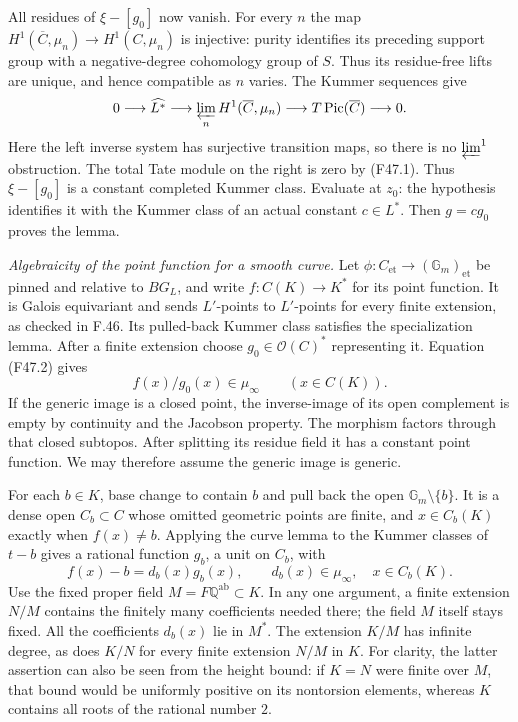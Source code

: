 All residues of $\xi-[g_0]$ now vanish. For every $n$ the map
$H^1(\overline C,\mu_n)\to H^1(C,\mu_n)$ is injective: purity
identifies its preceding support group with a negative-degree
cohomology group of $S$. Thus its residue-free lifts are unique,
and hence compatible as $n$ varies. The Kummer sequences give
\[
 0\longrightarrow\widehat{L^*}\longrightarrow
  \varprojlim_n H^1(\overline C,\mu_n)
  \longrightarrow T\operatorname{Pic}(\overline C)
  \longrightarrow0.
\]
Here the left inverse system has surjective transition maps, so
there is no $\varprojlim^1$ obstruction. The total Tate module on
the right is zero by (F47.1). Thus $\xi-[g_0]$ is a constant
completed Kummer class. Evaluate at $z_0$: the hypothesis identifies
it with the Kummer class of an actual constant $c\in L^*$.
Then $g=cg_0$ proves the lemma.

\emph{Algebraicity of the point function for a smooth curve.}
Let
$\phi:C_{\mathrm{et}}\to(\mathbb G_m)_{\mathrm{et}}$
be pinned and relative to $B G_L$, and write
$f:C(K)\to K^*$ for its point function. It is Galois equivariant
and sends $L'$-points to $L'$-points for every finite extension,
as checked in F.46. Its pulled-back Kummer class satisfies the
specialization lemma. After a finite extension choose
$g_0\in\mathcal O(C)^*$ representing it. Equation (F47.2) gives
\[
 f(x)/g_0(x)\in\mu_\infty\qquad(x\in C(K)).                 \tag{F47.4}
\]
If the generic image is a closed point, the inverse-image of its
open complement is empty by continuity and the Jacobson property.
The morphism factors through that closed subtopos. After splitting
its residue field it has a constant point function. We may therefore
assume the generic image is generic.

For each $b\in K$, base change to contain $b$ and pull back the
open $\mathbb G_m\setminus\{b\}$. It is a dense open
$C_b\subset C$ whose omitted geometric points are finite, and
$x\in C_b(K)$ exactly when $f(x)\ne b$. Applying the curve lemma
to the Kummer classes of $t-b$ gives a rational function $g_b$, a
unit on $C_b$, with
\[
 f(x)-b=d_b(x)g_b(x),\qquad d_b(x)\in\mu_\infty,
       \quad x\in C_b(K).                                 \tag{F47.5}
\]
Use the fixed proper field $M=F\mathbb Q^{\mathrm{ab}}\subset K$.
In any one argument, a finite extension $N/M$ contains the finitely
many coefficients needed there; the field $M$ itself stays fixed.
All the coefficients
$d_b(x)$ lie in $M^*$. The extension $K/M$ has infinite degree,
as does $K/N$ for every finite extension $N/M$ in $K$.
For clarity, the latter assertion can also be seen from the height
bound: if $K=N$ were finite over $M$, that bound would be uniformly
positive on its nontorsion elements, whereas $K$ contains all roots
of the rational number $2$.

